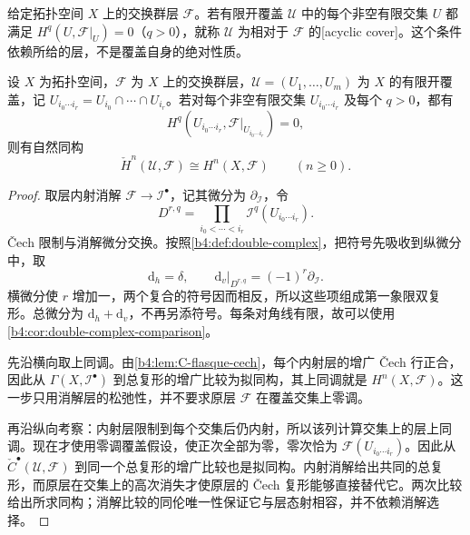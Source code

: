 给定拓扑空间 \(X\) 上的交换群层 \(\mathcal F\)。若有限开覆盖 \(\mathcal U\) 中的每个非空有限交集 \(U\) 都满足 \(H^q(U,\mathcal F|_U)=0\)（\(q>0\)），就称 \(\mathcal U\) 为相对于 \(\mathcal F\) 的[acyclic cover]。这个条件依赖所给的层，不是覆盖自身的绝对性质。

\begin{theorem}[零调覆盖的比较]\label{b4:thm:C-cech-comparison}
	设 \(X\) 为拓扑空间，\(\mathcal F\) 为 \(X\) 上的交换群层，\(\mathcal U=(U_1,\ldots,U_m)\) 为 \(X\) 的有限开覆盖，记 \(U_{i_0\cdots i_r}=U_{i_0}\cap\cdots\cap U_{i_r}\)。若对每个非空有限交集 \(U_{i_0\cdots i_r}\) 及每个 \(q>0\)，都有
	\[
		H^q(U_{i_0\cdots i_r},\mathcal F|_{U_{i_0\cdots i_r}})=0,
	\]
	则有自然同构
	\[
		\check H^n(\mathcal U,\mathcal F)\cong H^n(X,\mathcal F) \qquad(n\ge0).
	\]
\end{theorem}
\begin{proof}
	取层内射消解 \(\mathcal F\rightarrow\mathcal I^\bullet\)，记其微分为 \(\partial_{\mathcal I}\)，令
	\[
		D^{r,q}=\prod_{i_0<\cdots<i_r} \mathcal I^q(U_{i_0\cdots i_r}).
	\]
	Čech 限制与消解微分交换。按照\cref{b4:def:double-complex}，把符号先吸收到纵微分中，取
	\[
		\mathrm d_h=\delta,\qquad \mathrm d_v|_{D^{r,q}}=(-1)^r\partial_{\mathcal I}.
	\]
	横微分使 \(r\) 增加一，两个复合的符号因而相反，所以这些项组成第一象限双复形。总微分为 \(\mathrm d_h+\mathrm d_v\)，不再另添符号。每条对角线有限，故可以使用\cref{b4:cor:double-complex-comparison}。

	先沿横向取上同调。由\cref{b4:lem:C-flasque-cech}，每个内射层的增广 Čech 行正合，因此从 \(\Gamma(X,\mathcal I^\bullet)\) 到总复形的增广比较为拟同构，其上同调就是 \(H^n(X,\mathcal F)\)。这一步只用消解层的松弛性，并不要求原层 \(\mathcal F\) 在覆盖交集上零调。

	再沿纵向考察：内射层限制到每个交集后仍内射，所以该列计算交集上的层上同调。现在才使用零调覆盖假设，使正次全部为零，零次恰为 \(\mathcal F(U_{i_0\cdots i_r})\)。因此从 \(\check C^\bullet(\mathcal U,\mathcal F)\) 到同一个总复形的增广比较也是拟同构。内射消解给出共同的总复形，而原层在交集上的高次消失才使原层的 Čech 复形能够直接替代它。两次比较给出所求同构；消解比较的同伦唯一性保证它与层态射相容，并不依赖消解选择。
\end{proof}

